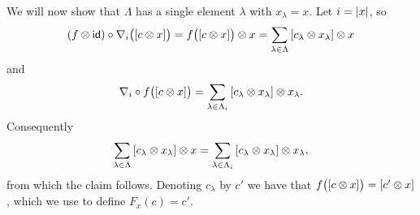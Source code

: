 We will now show that $\Lambda$ has a single element $\lambda$ with $x_\lambda = x$.
Let $i = \lvert x\rvert$, so
\begin{equation*} %
	(f \ot \id) \circ \nabla_i \big( [c \ot x] \big) =
	f \big( [c \ot x] \big) \ot x =
	\sum_{\lambda \in \Lambda} \, [c_\lambda \ot x_\lambda] \ot x
\end{equation*}
and
\begin{equation*} %
	\nabla_i \circ f \big( [c \ot x] \big) =
	\sum_{\lambda \in \Lambda_i} \, [c_\lambda \ot x_\lambda] \ot x_\lambda.
\end{equation*}
Consequently
\[
\sum_{\lambda \in \Lambda} \, [c_\lambda \otimes x_\lambda] \otimes x =
\sum_{\lambda \in \Lambda_i} \, [c_\lambda \otimes x_\lambda] \otimes x_\lambda,
\]
from which the claim follows.
Denoting $c_\lambda$ by $c'$ we have that $f \big( [c \otimes x] \big) = [c' \otimes x]$, which we use to define $F_x(c) = c'$.

